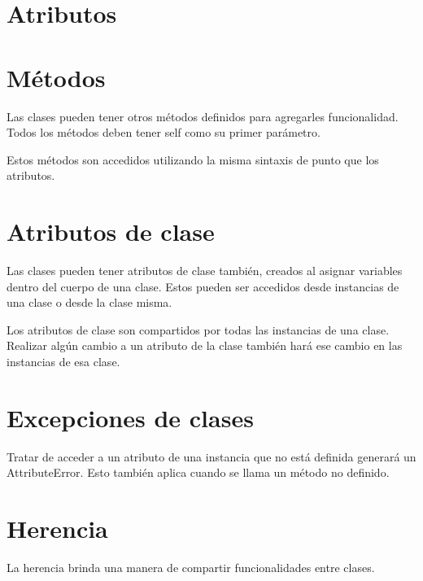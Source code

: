 \documentclass{report}
\begin{document}


\section{Atributos}

\section{Métodos}

Las clases pueden tener otros métodos definidos para agregarles funcionalidad. Todos los métodos deben tener self como su primer parámetro.\smallskip

Estos métodos son accedidos utilizando la misma sintaxis de punto que los atributos.


\section{Atributos de clase}

Las clases pueden tener atributos de clase también, creados al asignar variables dentro del cuerpo de una clase. Estos pueden ser accedidos desde instancias de una clase o desde la clase misma.


Los atributos de clase son compartidos por todas las instancias de una clase. Realizar algún cambio a un atributo de la clase también hará ese cambio en las instancias de esa clase.


\section{Excepciones de clases}

Tratar de acceder a un atributo de una instancia que no está definida generará un AttributeError. Esto también aplica cuando se llama un método no definido.


\section{Herencia}

La herencia brinda una manera de compartir funcionalidades entre clases.\smallskip
\end{document}
